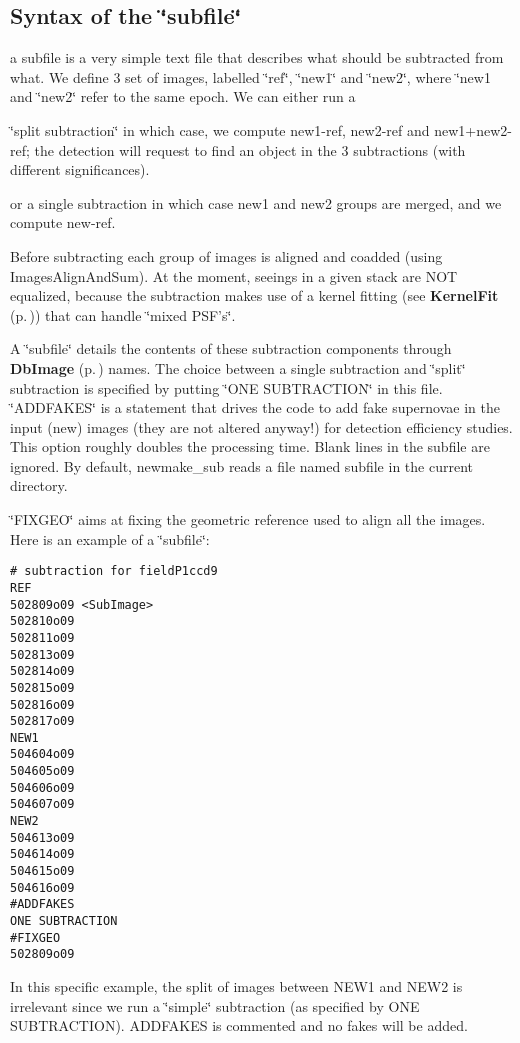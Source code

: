 \subsection{Syntax of the \char`\"{}subfile\char`\"{}}\label{newsubfile}
a subfile is a very simple text file that describes what should be  subtracted from what. We define 3 set of images, labelled \char`\"{}ref\char`\"{}, \char`\"{}new1\char`\"{} and \char`\"{}new2\char`\"{}, where \char`\"{}new1 and \char`\"{}new2\char`\"{} refer to the same epoch. We can either run a

\begin{CompactItemize}
\item 
\char`\"{}split subtraction\char`\"{} in which case, we compute new1-ref, new2-ref and new1+new2-ref; the detection will request to find an object in the 3 subtractions (with different significances). \item 
or a single subtraction in which case new1 and new2 groups are merged, and we compute new-ref.\end{CompactItemize}
Before subtracting each group of images is aligned and coadded (using Images\-Align\-And\-Sum). At the moment, seeings in a given stack are  NOT equalized, because the subtraction makes use of a kernel fitting (see {\bf Kernel\-Fit} {\rm (p.\,\pageref{class_kernelfit})}) that can handle \char`\"{}mixed PSF's\char`\"{}.

A \char`\"{}subfile\char`\"{} details the contents of these subtraction components through {\bf Db\-Image} {\rm (p.\,\pageref{class_dbimage})} names. The choice between a single subtraction and \char`\"{}split\char`\"{} subtraction is specified by putting \char`\"{}ONE SUBTRACTION\char`\"{} in this file. \char`\"{}ADDFAKES\char`\"{} is a  statement that drives the code to add fake supernovae in the input (new) images (they are not altered anyway!) for detection efficiency studies. This option roughly doubles the processing time. Blank lines in the subfile are ignored. By default, newmake\_\-sub reads a file named subfile in the current directory.

\char`\"{}FIXGEO\char`\"{} aims at fixing the geometric reference used to align all the images. Here is an example of a \char`\"{}subfile\char`\"{}:

\footnotesize\begin{verbatim}# subtraction for fieldP1ccd9
REF
502809o09 <SubImage>
502810o09
502811o09
502813o09
502814o09
502815o09
502816o09
502817o09
NEW1
504604o09
504605o09
504606o09
504607o09
NEW2
504613o09
504614o09
504615o09
504616o09
#ADDFAKES
ONE SUBTRACTION
#FIXGEO
502809o09\end{verbatim}\normalsize 


In this specific example, the split of images between NEW1 and NEW2 is irrelevant since we run a \char`\"{}simple\char`\"{} subtraction (as specified by ONE SUBTRACTION). ADDFAKES is commented and no fakes will be added.

